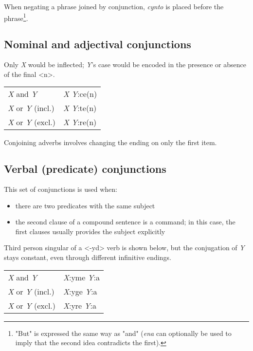 \documentclass{book}
\begin{document}
When negating a phrase joined by conjunction, \emph{cynto} is placed before the phrase\footnote{"But" is expressed the same way as "and" (\emph{ena} can optionally be used to imply that the second idea contradicts the first).}.

\subsection{Nominal and adjectival conjunctions}

Only \emph{X} would be inflected; \emph{Y}'s case would be encoded in the presence or absence of the final <n>.

\begin{center}
	\begin{tabular}{|l|l|}
	  \hline
	  \emph{X} and \emph{Y} & \emph{X} \emph{Y}:ce(n) \\
	  \emph{X} or \emph{Y} (incl.) & \emph{X} \emph{Y}:te(n) \\
	  \emph{X} or \emph{Y} (excl.) & \emph{X} \emph{Y}:re(n) \\ \hline
	\end{tabular}
\end{center}

Conjoining adverbs involves changing the ending on only the first item.

\subsection{Verbal (predicate) conjunctions}

This set of conjunctions is used when:

\begin{itemize}
	\item there are two predicates with the same subject
	\item the second clause of a compound sentence is a command; in this case, the first clauses usually provides the subject explicitly
\end{itemize}

Third person singular of a <-yd> verb is shown below, but the conjugation of \emph{Y} stays constant, even through different infinitive endings.

\begin{center}
	\begin{tabular}{|l|l|}
	  \hline
	  \emph{X} and \emph{Y} & \emph{X}:yme \emph{Y}:a \\
	  \emph{X} or \emph{Y} (incl.) & \emph{X}:yge \emph{Y}:a \\
	  \emph{X} or \emph{Y} (excl.) & \emph{X}:yre \emph{Y}:a \\ \hline
	\end{tabular}
\end{center}
\end{document}
